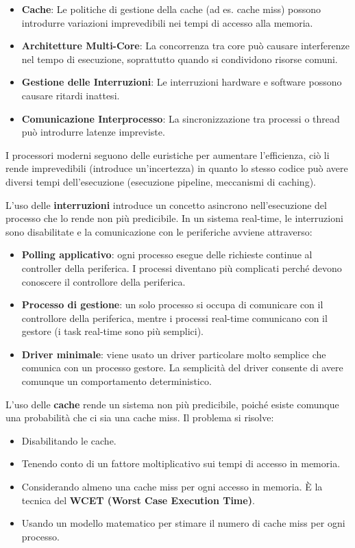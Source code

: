 \documentclass[11pt,a4paper]{report}
\begin{document}
\begin{itemize}
    \item \textbf{Cache}: Le politiche di gestione della cache (ad es. cache miss) possono introdurre variazioni imprevedibili nei tempi di accesso alla memoria.
    \item \textbf{Architetture Multi-Core}: La concorrenza tra core può causare interferenze nel tempo di esecuzione, soprattutto quando si condividono risorse comuni.
    \item \textbf{Gestione delle Interruzioni}: Le interruzioni hardware e software possono causare ritardi inattesi.
    \item \textbf{Comunicazione Interprocesso}: La sincronizzazione tra processi o thread può introdurre latenze impreviste.
\end{itemize}

I processori moderni seguono delle euristiche per aumentare l'efficienza, ciò li rende imprevedibili (introduce un'incertezza) in quanto lo stesso codice può avere diversi tempi dell'esecuzione (esecuzione pipeline, meccanismi di caching).

L'uso delle \textbf{interruzioni} introduce un concetto asincrono nell'esecuzione del processo che lo rende non più predicibile. In un sistema real-time, le interruzioni sono disabilitate e la comunicazione con le periferiche avviene attraverso:
\begin{itemize}
    \item \textbf{Polling applicativo}: ogni processo esegue delle richieste continue al controller della periferica. I processi diventano più complicati perché devono conoscere il controllore della periferica.
    \item \textbf{Processo di gestione}: un solo processo si occupa di comunicare con il controllore della periferica, mentre i processi real-time comunicano con il gestore (i task real-time sono più semplici).
    \item \textbf{Driver minimale}: viene usato un driver particolare molto semplice che comunica con un processo gestore. La semplicità del driver consente di avere comunque un comportamento deterministico.
\end{itemize}

L'uso delle \textbf{cache} rende un sistema non più predicibile, poiché esiste comunque una probabilità che ci sia una cache miss. Il problema si risolve:
\begin{itemize}
    \item Disabilitando le cache.
    \item Tenendo conto di un fattore moltiplicativo sui tempi di accesso in memoria.
    \item Considerando almeno una cache miss per ogni accesso in memoria. È la tecnica del \textbf{WCET (Worst Case Execution Time)}.
    \item Usando un modello matematico per stimare il numero di cache miss per ogni processo.
\end{itemize}
\end{document}
